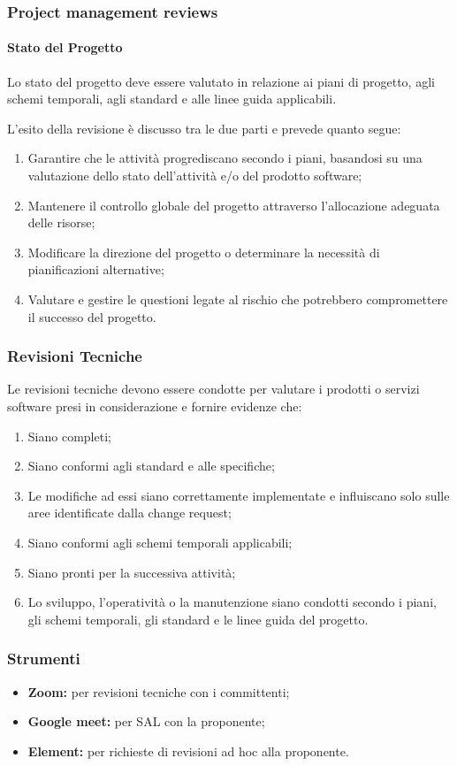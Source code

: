 \subsubsection{Project management reviews}

\paragraph{Stato del Progetto}
Lo stato del progetto deve essere valutato in relazione ai piani di progetto, agli schemi temporali, agli standard e alle linee guida applicabili.

L'esito della revisione è discusso tra le due parti e prevede quanto segue:

\begin{enumerate}
    \item Garantire che le attività progrediscano secondo i piani, basandosi su una valutazione dello stato dell'attività e/o del prodotto software;
    \item Mantenere il controllo globale del progetto attraverso l'allocazione adeguata delle risorse;
    \item Modificare la direzione del progetto o determinare la necessità di pianificazioni alternative;
    \item Valutare e gestire le questioni legate al rischio che potrebbero compromettere il successo del progetto.
\end{enumerate}

\subsubsection{Revisioni Tecniche}
Le revisioni tecniche devono essere condotte per valutare i prodotti o servizi software presi in considerazione e fornire evidenze che:

\begin{enumerate}
    \item Siano completi;
    \item Siano conformi agli standard e alle specifiche;
    \item Le modifiche ad essi siano correttamente implementate e influiscano solo sulle aree identificate dalla change request;
    \item Siano conformi agli schemi temporali applicabili;
    \item Siano pronti per la successiva attività;
    \item Lo sviluppo, l'operatività o la manutenzione siano condotti secondo i piani, gli schemi temporali, gli standard e le linee guida del progetto.
\end{enumerate}

\subsubsection{Strumenti}

\begin{itemize}
    \item \textbf{Zoom:} per revisioni tecniche con i committenti;
    \item \textbf{Google meet:} per SAL con la proponente; 
    \item \textbf{Element:} per richieste di revisioni ad hoc alla proponente.
\end{itemize}
